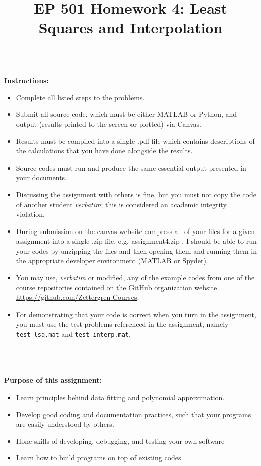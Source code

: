\documentclass{article}
\begin{document}
\title{EP 501 Homework 4:  Least Squares and Interpolation}

\maketitle

~\\
\textbf{Instructions:}  
\begin{itemize}
  \item Complete all listed steps to the problems.
  \item Submit all source code, which must be either MATLAB or Python, and output (results printed to the screen or plotted) via Canvas.  
  \item Results must be compiled into a single .pdf file which contains descriptions of the calculations that you have done alongside the results.  
  \item Source codes must run and produce the same essential output presented in your documents.  
  \item Discussing the assignment with others is fine, but you must not copy the code of another student \emph{verbatim}; this is considered an academic integrity violation.  
  \item During submission on the canvas website compress all of your files for a given assignment into a single .zip file, e.g. \textsf{assignment4.zip} .  I should be able to run your codes by unzipping the files and then opening them and running them in the appropriate developer environment (MATLAB or Spyder).  
  \item You may use, \emph{verbatim} or modified, any of the example codes from one of the course repositories contained on the GitHub organization website  \url{https://github.com/Zettergren-Courses}. 
  \item For demonstrating that your code is correct when you turn in the assignment, you must use the test problems referenced in the assignment, namely \texttt{test\_lsq.mat} and \texttt{test\_interp.mat}.  

\end{itemize}
~\\~\\~\\
\textbf{Purpose of this assignment:}  
\begin{itemize}
  \item Learn principles behind data fitting and polynomial approximation.  
  \item Develop good coding and documentation practices, such that your programs are easily understood by others.  
  \item Hone skills of developing, debugging, and testing your own software
  \item Learn how to build programs on top of existing codes
\end{itemize}
\end{document}

